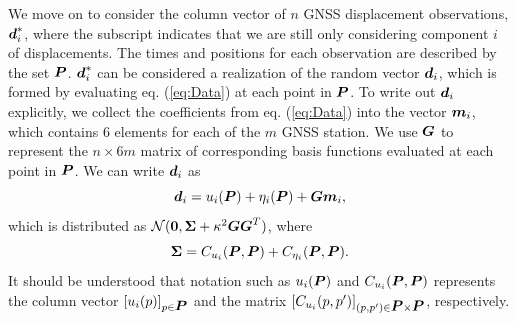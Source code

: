 \documentclass[extra,mreferee]{gji}
\begin{document}
We move on to consider the column vector of $n$ GNSS displacement observations, $\mitbf{d}^*_i$, where the subscript indicates that we are still only considering component $i$ of displacements. The times and positions for each observation are described by the set $\mitbf{P}$. $\mitbf{d}^*_i$ can be considered a realization of the random vector $\mitbf{d}_i$, which is formed by evaluating eq. (\ref{eq:Data}) at each point in $\mitbf{P}$. To write out $\mitbf{d}_i$ explicitly, we collect the coefficients from eq. (\ref{eq:Data}) into the vector $\mitbf{m}_i$, which contains 6 elements for each of the $m$ GNSS station. We use $\mitbf{G}$ to represent the $n \times 6m$ matrix of corresponding basis functions evaluated at each point in $\mitbf{P}$. We can write $\mitbf{d}_i$ as 
\begin{equation}
\mitbf{d}_i = u_i(\mitbf{P}) + \eta_i(\mitbf{P}) + \mitbf{G}\mitbf{m}_i,
\end{equation}
which is distributed as $\mathcal{N}(\mitbf{0},\mitbf{\Sigma} + \kappa^2\mitbf{G}\mitbf{G}^T)$, where
\begin{equation}\label{eq:Cd}
\mitbf{\Sigma} = C_{u_i}(\mitbf{P},\mitbf{P}) + C_{\eta_i}(\mitbf{P},\mitbf{P}).  
\end{equation}
It should be understood that notation such as $u_i(\mitbf{P})$ and $C_{u_i}(\mitbf{P},\mitbf{P})$ represents the column vector $[u_i(p)]_{p \in \mitbf{P}}$ and the matrix $[C_{u_i}(p,p')]_{(p,p') \in \mitbf{P} \times \mitbf{P}}$, respectively. 
\end{document}
